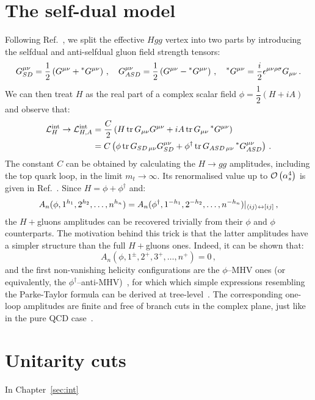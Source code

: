 \documentclass[main.tex]{subfiles}
\begin{document}
\section{The self-dual model}
Following Ref.~\cite{Dixon:2004za}, we split the effective $Hgg$ vertex into two parts by introducing the selfdual and anti-selfdual gluon field strength tensors:
\begin{equation}
    G^{\mu\nu}_{SD} = \frac{1}{2} \left(G^{\mu\nu} + \prescript{\ast}{}{G}^{\mu\nu} \right)\,, \quad     G^{\mu\nu}_{ASD} = \frac{1}{2} \left(G^{\mu\nu} - \prescript{\ast}{}{G}^{\mu\nu} \right)\,, \quad\prescript{\ast}{}{G}^{\mu\nu} = \frac{i}{2} \epsilon^{\mu\nu\rho\sigma} G_{\mu\nu}\,.
\end{equation}
We can then treat $H$ as the real part of a complex scalar field $\phi = \dfrac{1}{2}(H+i A)$ and observe that:
\begin{align}
    \mathcal{L}_H^{\text{int}} \rightarrow \mathcal{L}_{H, A}^{\text{int}} &= \frac{C}{2} \left( H \operatorname{\rm tr} {G}_{\mu\nu}{G}^{\mu\nu} + iA \operatorname{\rm tr} {G}_{\mu\nu}\prescript{\ast}{}{G}^{\mu\nu}\right) \\
    &= C \left( \phi \operatorname{\rm tr} {G}_{SD\,\mu\nu}{G}_{SD}^{\mu\nu} + \phi^\dagger \operatorname{\rm tr} {G}_{ASD\,\mu\nu}\prescript{\ast}{}{G}_{ASD}^{\mu\nu}\right)\,.
\end{align} 
The constant $C$ can be obtained by calculating the $H \rightarrow gg$ amplitudes, including the top quark loop, in the limit $m_t \rightarrow \infty$. Its renormalised value up to $\mathcal{O}\left(\alpha_s^4\right)$ is given in Ref.~\cite{Chetyrkin:1997iv}. Since $H = \phi + \phi^\dagger$ and:
\begin{equation}
    A_n(\phi, 1^{h_1},2^{h_2}, \ldots, n^{h_n}) = A_n(\phi^\dagger, 1^{-h_1},2^{-h_2}, \ldots, n^{-h_n}) \rvert_{\langle ij\rangle \leftrightarrow [ij]} \,,
\end{equation}
the $H+$gluons amplitudes can be recovered trivially from their $\phi$ and $\phi$ counterparts. The motivation behind this trick is that the latter amplitudes have a simpler structure than the full $H+$gluons ones. Indeed, it can be shown that: 
\begin{equation}
    A_n(\phi, 1^\pm,2^+,3^+, \ldots, n^+) = 0 \,,
\end{equation}
and the first non-vanishing helicity configurations are the $\phi$--MHV ones (or equivalently, the $\phi^\dagger$--anti-MHV)~\cite{Berends:1988759}, for which which simple expressions resembling the Parke-Taylor formula can be derived at tree-level~\cite{Dixon:2004za}. The corresponding one-loop amplitudes  are finite and free of branch cuts in the complex plane, just like in the pure QCD case~\cite{Mahlon:1993si}. 

\section{Unitarity cuts}
In Chapter~\ref{sec:int}
\end{document}
